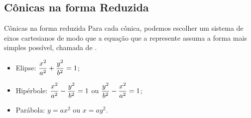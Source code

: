 \subsection*{Cônicas na forma Reduzida}
\begin{frame}[label=conicas]{Cônicas na forma reduzida}
Para cada cônica, podemos escolher um sistema de eixos cartesianos de modo que a equação que a represente assuma a forma mais simples possível, chamada de .

\begin{itemize}
\item Elipse: $\displaystyle\frac{x^2}{a^2}+\frac{y^2}{b^2}=1$;

\item Hipérbole: $\displaystyle\frac{x^2}{a^2}-\frac{y^2}{b^2}=1$ ou $\displaystyle\frac{y^2}{b^2}-\frac{x^2}{a^2}=1$;

\item Parábola: $y=ax^2$ ou $x=ay^2$.
\end{itemize}
\end{frame}


